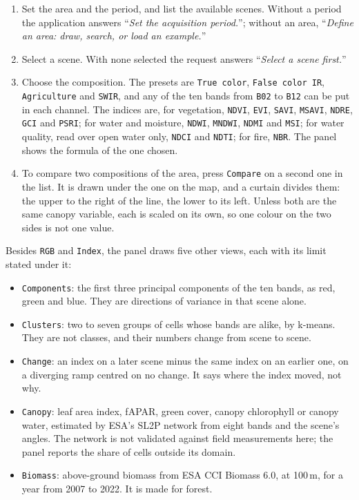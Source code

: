 \documentclass[12pt,a4paper]{article}
\newcommand{\msg}[1]{``\textit{#1}''}
\begin{document}
\begin{enumerate}[leftmargin=*,itemsep=.25em]
  \item Set the area and the period, and list the available scenes. Without a
        period the application answers \msg{Set the acquisition period.};
        without an area, \msg{Define an area: draw, search, or load an
        example.}
  \item Select a scene. With none selected the request answers \msg{Select a
        scene first.}
  \item Choose the composition. The presets are \texttt{True color},
        \texttt{False color IR}, \texttt{Agriculture} and \texttt{SWIR}, and
        any of the ten bands from \texttt{B02} to \texttt{B12} can be put in
        each channel. The indices are, for vegetation, \texttt{NDVI},
        \texttt{EVI}, \texttt{SAVI}, \texttt{MSAVI}, \texttt{NDRE},
        \texttt{GCI} and \texttt{PSRI}; for water and moisture, \texttt{NDWI},
        \texttt{MNDWI}, \texttt{NDMI} and \texttt{MSI}; for water quality,
        read over open water only, \texttt{NDCI} and \texttt{NDTI}; for fire,
        \texttt{NBR}. The panel shows the formula of the one chosen.
  \item To compare two compositions of the area, press \texttt{Compare} on a
        second one in the list. It is drawn under the one on the map, and a
        curtain divides them: the upper to the right of the line, the lower to
        its left. Unless both are the same canopy variable, each is scaled on
        its own, so one colour on the two sides is not one value.
\end{enumerate}

Besides \texttt{RGB} and \texttt{Index}, the panel draws five other views,
each with its limit stated under it:

\begin{itemize}[leftmargin=*,itemsep=.25em]
  \item \texttt{Components}: the first three principal components of the ten
        bands, as red, green and blue. They are directions of variance in that
        scene alone.
  \item \texttt{Clusters}: two to seven groups of cells whose bands are alike,
        by k-means. They are not classes, and their numbers change from scene
        to scene.
  \item \texttt{Change}: an index on a later scene minus the same index on an
        earlier one, on a diverging ramp centred on no change. It says where
        the index moved, not why.
  \item \texttt{Canopy}: leaf area index, fAPAR, green cover, canopy
        chlorophyll or canopy water, estimated by ESA's SL2P network from eight
        bands and the scene's angles. The network is not validated against
        field measurements here; the panel reports the share of cells outside
        its domain.
  \item \texttt{Biomass}: above-ground biomass from ESA CCI Biomass 6.0, at
        100\,m, for a year from 2007 to 2022. It is made for forest.
\end{itemize}
\end{document}
